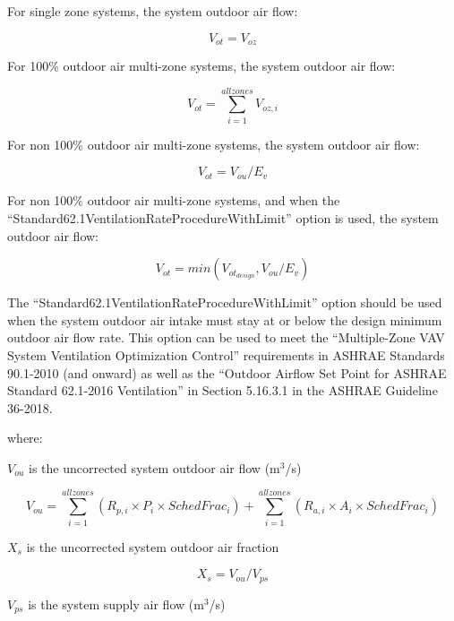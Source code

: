 For single zone systems, the system outdoor air flow:

\begin{equation}
{V_{ot}} = {V_{oz}}
\end{equation}

For 100\% outdoor air multi-zone systems, the system outdoor air flow:

\begin{equation}
{V_{ot}} = \mathop \sum \limits_{i = 1}^{allzones} {V_{oz,i}}
\end{equation}

For non 100\% outdoor air multi-zone systems, the system outdoor air flow:

\begin{equation}
{V_{ot}} = {V_{ou}}/{E_v}
\end{equation}

For non 100\% outdoor air multi-zone systems, and when the ``Standard62.1VentilationRateProcedureWithLimit'' option is used, the system outdoor air flow:

\begin{equation}
{V_{ot}} = min(V_{{ot}_{design}}, {V_{ou}}/{E_v})
\end{equation}

The ``Standard62.1VentilationRateProcedureWithLimit'' option should be used when the system outdoor air intake must stay at or below the design minimum outdoor air flow rate. This option can be used to meet the ``Multiple-Zone VAV System Ventilation Optimization Control'' requirements in ASHRAE Standards 90.1-2010 (and onward) as well as the ``Outdoor Airflow Set Point for ASHRAE Standard 62.1-2016 Ventilation'' in Section 5.16.3.1 in the ASHRAE Guideline 36-2018.

where:

\({V_{ou}}\) is the uncorrected system outdoor air flow (m\(^3\)/s)

\begin{equation}
{V_{ou}} = \mathop \sum \limits_{i = 1}^{allzones} ({R_{p,i}} \times {P_i} \times {SchedFrac_i}) + \mathop \sum \limits_{i = 1}^{allzones} ({R_{a,i}} \times {A_i} \times {SchedFrac_i})
\end{equation}

\({X_s}\) is the uncorrected system outdoor air fraction

\begin{equation}
{X_s} = {V_{ou}}/{V_{ps}}
\end{equation}

\({V_{ps}}\) is the system supply air flow (m\(^3\)/s)

